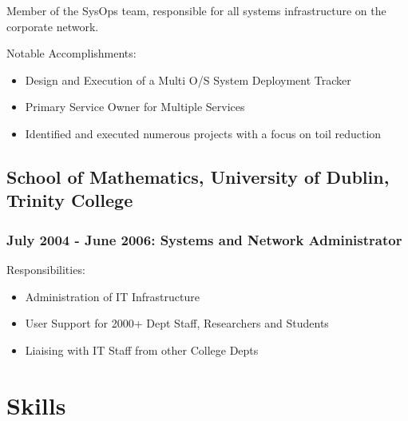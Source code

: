 \documentclass[a4paper, 10pt] {article}
\begin{document}
Member of the SysOps team, responsible for all systems infrastructure on the corporate network.

\vspace{5mm} %

Notable Accomplishments:

\begin{itemize}[itemsep=2pt,parsep=2pt]
  \item Design and Execution of a Multi O/S System Deployment Tracker
  \item Primary Service Owner for Multiple Services
  \item Identified and executed numerous projects with a focus on toil reduction
\end{itemize}

\subsection*{School of Mathematics, University of Dublin, Trinity College}

\subsubsection*{July 2004 - June 2006: Systems and Network Administrator}

Responsibilities:

\begin{itemize}[itemsep=2pt,parsep=2pt]
  \item Administration of IT Infrastructure
  \item User Support for 2000+ Dept Staff, Researchers and Students
  \item Liaising with IT Staff from other College Depts
\end{itemize}

\section*{Skills}
\end{document}
